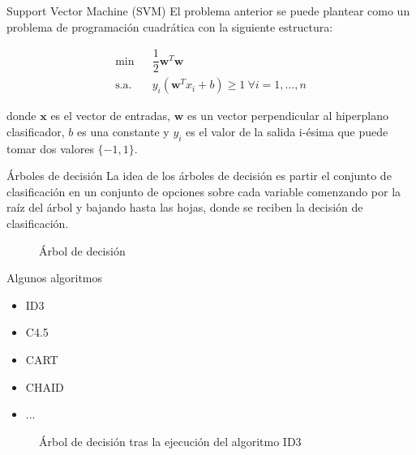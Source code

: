 \documentclass[hyperref={unicode}]{beamer}
\begin{document}
\begin{frame}{Support Vector Machine (SVM)}
	El problema anterior se puede plantear como un problema de programación cuadrática con la siguiente estructura:
	
	\begin{align}
	 \min & \ \ \ \dfrac{1}{2}\mathbf{w}^T \mathbf{w}\\
	 \text{s.a. } & \ \ \ y_i (\mathbf{w}^T x_i + b) \geq 1 \ \forall i = 1,\dots, n
	 \end{align}
	 
	 donde $\mathbf{x}$ es el vector de entradas, $\mathbf{w}$ es un vector perpendicular al hiperplano clasificador, $b$ es una constante y $y_i$ es el valor de la salida i-ésima que puede  tomar dos valores $\{-1,1\}$. 
	 
\end{frame}

\begin{frame}{Árboles de decisión}
	La idea de los árboles de decisión es partir el conjunto de clasificación en un conjunto de opciones sobre cada variable comenzando por la raíz del árbol y bajando hasta las hojas, donde se reciben la decisión de clasificación.
	
	\begin{figure}[htbp!]
		\centering
			\resizebox{!}{0.3\textwidth}{\arboldedecision}
		\caption{Árbol de decisión}
		\label{fig:arboldecision}
	\end{figure}
\end{frame}

\begin{frame}{Algunos algoritmos}
	\begin{minipage}{0.2\textwidth}
	\begin{itemize}
		\item ID3
		\item C4.5
		\item CART
		\item CHAID
		\item ...
		\end{itemize}
	\end{minipage}
	\hfill
	\begin{minipage}{0.7\textwidth}
		\begin{figure}[htbp!]
				\centering
				
				\resizebox{!}{0.5\textwidth}{\ejemploarboldecision}
				\caption{Árbol de decisión tras la ejecución del algoritmo ID3}
				\label{fig:arboldecisionejemplo}
			\end{figure}
	\end{minipage}
\end{frame}
\end{document}
